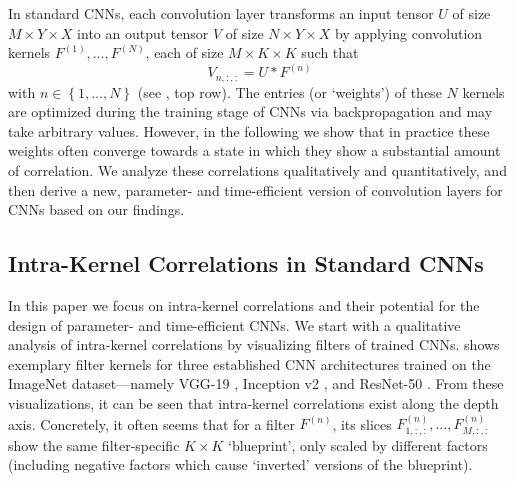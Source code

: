 \documentclass[10pt,twocolumn,letterpaper]{article}
\newcommand{\tensorIn}{U}
\newcommand{\tensorOut}{V}
\newcommand{\filter}[1]{F^{(#1)}}
\newcommand{\spatialV}{Y}
\newcommand{\spatialW}{X}
\newcommand{\spatialK}{K}
\newcommand{\channelInCount}{M}
\newcommand{\channelOutCount}{N}
\newcommand{\channelOutIndex}{n}
\begin{document}
In standard CNNs, each convolution layer transforms an input tensor $\tensorIn$ of size $\channelInCount \times \spatialV \times \spatialW$ into an output tensor $\tensorOut$ of size $\channelOutCount \times \spatialV \times \spatialW$ by applying convolution kernels $\filter{1}, \dots, \filter{\channelOutCount}$, each of size $\channelInCount \times \spatialK \times \spatialK$ such that
\begin{equation}
	\tensorOut_{\channelOutIndex, :, :} = \tensorIn * \filter{\channelOutIndex}
	\label{eq:standardConvolution}
\end{equation}
with $\channelOutIndex \in \left\{1, \dots, \channelOutCount \right\}$ (see , top row).
The entries (or `weights') of these $\channelOutCount$ kernels are optimized during the training stage of CNNs via backpropagation and may take arbitrary values.
However, in the following we show that in practice these weights often converge towards a state in which they show a substantial amount of correlation.
We analyze these correlations qualitatively and quantitatively, and then derive a new, parameter- and time-efficient version of convolution layers for CNNs based on our findings.

\subsection{Intra-Kernel Correlations in Standard CNNs}
\label{subsec:intraKernelCorrelations}
In this paper we focus on intra-kernel correlations and their potential for the design of parameter- and time-efficient CNNs.
We start with a qualitative analysis of intra-kernel correlations by visualizing filters of trained CNNs.
 shows exemplary filter kernels for three established CNN architectures trained on the ImageNet dataset---namely VGG-19 \cite{simonyan2014very}, Inception v2 \cite{ioffe2015batch}, and ResNet-50 \cite{he2016deep,he2016identity}.
From these visualizations, it can be seen that intra-kernel correlations exist along the depth axis.
Concretely, it often seems that for a filter $\filter{\channelOutIndex}$, its slices $\filter{\channelOutIndex}_{1, :, :}, \dots, \filter{\channelOutIndex}_{\channelInCount, :, :}$ show the same filter-specific $\spatialK \times \spatialK$ `blueprint', only scaled by different factors (including negative factors which cause `inverted' versions of the blueprint).
\end{document}
